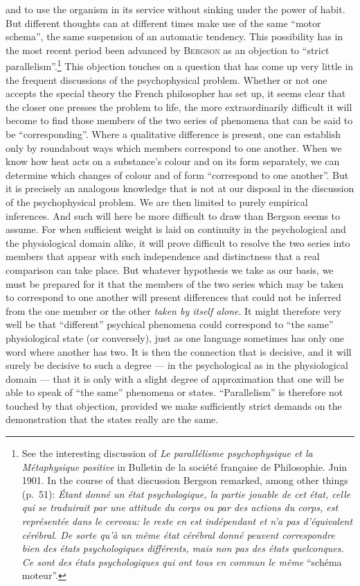 \documentclass[12pt,a4paper]{book}
\newcommand{\opage}[1]{\marginnote{\footnotesize\textit{[#1]}}}
\begin{document}
and to use the organism in its service without sinking under the power of habit.
But different thoughts can at different times make use of the same ``motor
schema'', the same suspension of an automatic tendency. This possibility has in
the most recent period been advanced by \textsc{Bergson} as an objection to
``strict parallelism''.\footnote{See the interesting discussion of \textit{Le
parallélisme \opage{87}psychophysique et la Métaphysique positive} in Bulletin de la
société française de Philosophie. Juin 1901. In the course of that discussion
Bergson remarked, among other things (p.~51): \textit{Étant donné un état
psychologique, la partie jouable de cet état, celle qui se traduirait par une
attitude du corps ou par des actions du corps, est représentée dans le cerveau:
le reste en est indépendant et n'a pas d'équivalent cérébral. De sorte qu'à un
même état cérébral donné peuvent correspondre bien des états psychologiques
différents, mais non pas des états quelconques. Ce sont des états psychologiques
qui ont tous en commun le même} ``schéma moteur''.} This objection touches on a
question that has come up very little in the frequent discussions of the
psychophysical problem. Whether or not one accepts the special theory the French
philosopher has set up, it seems clear that the closer one presses the problem
to life, the more extraordinarily difficult it will become to find those members
of the two series of phenomena that can be said to be ``corresponding''. Where a
qualitative difference is present, one can establish only by roundabout ways
which members correspond to one another. When we know how heat acts on a
substance's colour and on its form separately, we can determine which changes of
colour and of form ``correspond to one another''. But it is precisely an
analogous knowledge that is not at our disposal in the discussion of the
psychophysical problem. We are then limited to purely empirical inferences. And
such will here be more difficult to draw than Bergson seems to assume. For when
sufficient weight is laid on continuity in the psychological and the
physiological domain alike, it will prove difficult to resolve the two series
into members that appear with such independence and distinctness that a real
comparison can take place. But whatever hypothesis we take as our basis, we must
be prepared for it that the members of the two series which may be taken to
correspond to one another will present differences that could not be inferred
from the one member or the other \emph{taken by itself alone}. It might
therefore very well be that ``different'' psychical phenomena could correspond
to ``the same'' physiological state (or conversely), just as one language
sometimes has only one word where another has two. \opage{25}It is then the connection
that is decisive, and it will surely be decisive to such a degree --- in the
psychological as in the physiological domain --- that it is only with a slight
degree of approximation that one will be able to speak of ``the same'' phenomena
or states. ``Parallelism'' is therefore not touched by that objection, provided
we make sufficiently strict demands on the demonstration that the states really
are the same.
\end{document}

